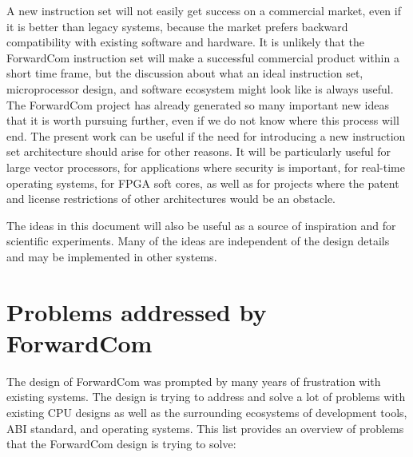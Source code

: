 \documentclass[forwardcom.tex]{subfiles}
\begin{document}
A new instruction set will not easily get success on a commercial market, even if it is better than legacy systems, because the market prefers backward compatibility with existing software and hardware. It is unlikely that the ForwardCom instruction set will make a successful commercial product within a short time frame, but the discussion about what an ideal instruction set, microprocessor design, and software ecosystem might look like is always useful. The ForwardCom project has already generated so many important new ideas that it is worth pursuing further, even if we do not know where this process will end. The present work can be useful if the need for introducing a new instruction set architecture should arise for other reasons. It will be particularly useful for large vector processors, for applications where security is important, for real-time operating systems, for FPGA soft cores, as well as for projects where the patent and license restrictions of other architectures would be an obstacle.
\vv

The ideas in this document will also be useful as a source of inspiration and for scientific experiments. Many of the ideas are independent of the design details and may be implemented in other systems.
\vv

\section{Problems addressed by ForwardCom}
The design of ForwardCom was prompted by many years of frustration with existing systems. The design is trying to address and solve a lot of problems with existing CPU designs as well as the surrounding ecosystems of development tools, ABI standard, and operating systems. This list provides an overview of problems that the ForwardCom design is trying to solve:
\vv
\end{document}
